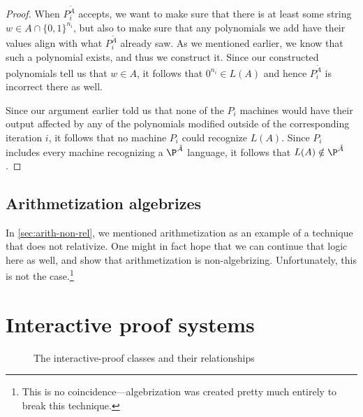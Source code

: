 \documentclass[english,12pt]{reedthesis}
\theoremstyle{plain}
\theoremstyle{definition}
\theoremstyle{remark}
\begin{document}
\begin{proof}
  When $P_{i}^{\tilde{A}}$ accepts, we want to make sure that there is at least
  some string $w \in A \cap \{0, 1\}^{n_{i}}$, but also to make sure that any
  polynomials we add have their values align with what $P_{i}^{\tilde{A}}$
  already saw. As we mentioned earlier, we know that such a polynomial exists,
  and thus we construct it. Since our constructed polynomials tell us that
  $w \in A$, it follows that $0^{n_{i}} \in L(A)$ and hence $P_{i}^{\tilde{A}}$ is
  incorrect there as well.

  Since our argument earlier told us that none of the $P_{i}$ machines would
  have their output affected by any of the polynomials modified outside of the
  corresponding iteration $i$, it follows that no machine $P_{i}$ could
  recognize $L(A)$. Since $P_{i}$ includes every machine recognizing a
  $\P^{\tilde{A}}$ language, it follows that $L(A) \notin \P^{\tilde{A}}$.
\end{proof}

\section{Arithmetization algebrizes}\label{sec:arith-algebrizes}

In \cref{sec:arith-non-rel}, we mentioned arithmetization as an example of a
technique that does not relativize. One might in fact hope that we can continue
that logic here as well, and show that arithmetization is non-algebrizing.
Unfortunately, this is not the case.\footnote{This is no
  coincidence---algebrization was created pretty much entirely to break this
  technique.}


\chapter{Interactive proof systems}\label{chap:ips}

\begin{figure}[htbp]
  \centering
  \caption{The interactive-proof classes and their
    relationships}\label{fig:ip-class-venn}
\end{figure}
\end{document}
